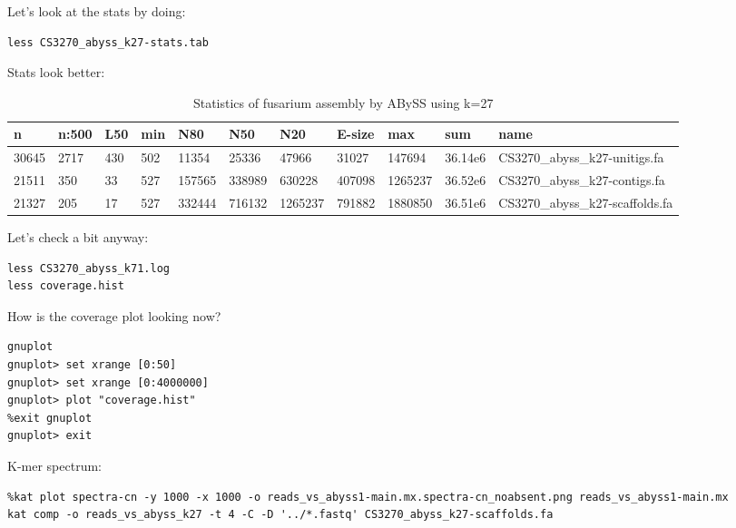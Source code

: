 \begin{steps}
Let's look at the stats by doing:
\begin{lstlisting}
less CS3270_abyss_k27-stats.tab
\end{lstlisting}
\end{steps}

Stats look better:
\begin{table}[H]
\small
  \centering
  \caption{Statistics of fusarium assembly by ABySS using k=27}
    \begin{tabular}{lllllllllll}
    \toprule
    \textbf{n} & \textbf{n:500} & \textbf{L50} & \textbf{min} & \textbf{N80}& \textbf{N50}& \textbf{N20}& \textbf{E-size}& \textbf{max} & \textbf{sum}& \textbf{name}\\
    \midrule
    30645  & 2717   & 430  & 502  & 11354   & 25336   & 47966    & 31027   & 147694   & 36.14e6  & CS3270\_abyss\_k27-unitigs.fa \\
	21511  & 350    & 33   & 527  & 157565  & 338989  & 630228   & 407098  & 1265237  & 36.52e6  & CS3270\_abyss\_k27-contigs.fa \\
	21327  & 205    & 17   & 527  & 332444  & 716132  & 1265237  & 791882  & 1880850  & 36.51e6  & CS3270\_abyss\_k27-scaffolds.fa \\
    \bottomrule
    \end{tabular}
  \label{tab:fusariumk27}
\end{table}

\begin{steps}
Let's check a bit anyway:
\begin{lstlisting}
less CS3270_abyss_k71.log
less coverage.hist
\end{lstlisting}
\end{steps}

\begin{steps}
How is the coverage plot looking now?
\begin{lstlisting}
gnuplot
gnuplot> set xrange [0:50]
gnuplot> set xrange [0:4000000]
gnuplot> plot "coverage.hist"
%exit gnuplot
gnuplot> exit
\end{lstlisting}
\end{steps}

\begin{steps}
K-mer spectrum:
\begin{lstlisting}
%kat plot spectra-cn -y 1000 -x 1000 -o reads_vs_abyss1-main.mx.spectra-cn_noabsent.png reads_vs_abyss1-main.mx
kat comp -o reads_vs_abyss_k27 -t 4 -C -D '../*.fastq' CS3270_abyss_k27-scaffolds.fa
\end{lstlisting}
\end{steps}

